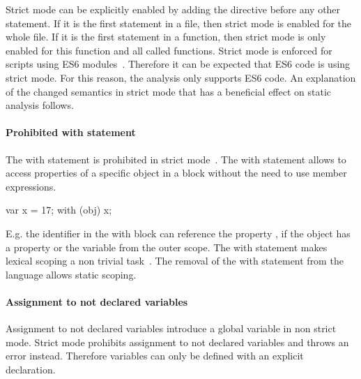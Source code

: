 Strict mode can be explicitly enabled by adding the  directive before any other statement. If it is the first statement in a file, then strict mode is enabled for the whole file. If it is the first statement in a function, then strict mode is only enabled for this function and all called functions. Strict mode is enforced for scripts using ES6 modules~\cite[10.2.1]{Ecma2015}. Therefore it can be expected that ES6 code is using strict mode. For this reason, the analysis only supports ES6 code. An explanation of the changed semantics in strict mode that has a beneficial effect on static analysis follows.

\paragraph{Prohibited with statement}
The with statement is prohibited in strict mode~\cite[Annex C]{Ecma2015}. The with statement allows to access properties of a specific object in a block without the need to use member expressions.

\begin{javascriptcode}
var x = 17;
with (obj)
{
	x;
}
\end{javascriptcode}

E.g. the identifier  in the with block can reference the property , if the object has a property  or the variable  from the outer scope. The with statement makes lexical scoping a non trivial task~\cite{JensenMollerThiemann2009}. The removal of the with statement from the language allows static scoping.

\paragraph{Assignment to not declared variables}
Assignment to not declared variables introduce a global variable in non strict mode. Strict mode prohibits assignment to not declared variables and throws an error instead. Therefore variables can only be defined with an explicit declaration.